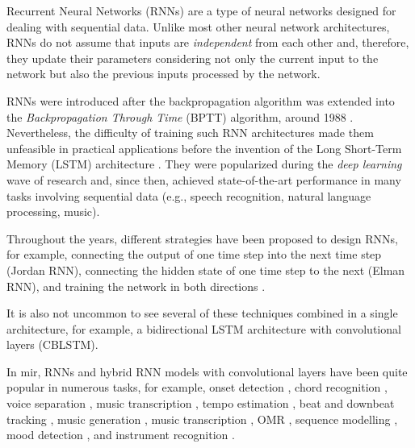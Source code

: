

Recurrent Neural Networks (RNNs) are a type of neural
networks designed for dealing with sequential data. Unlike
most other neural network architectures, RNNs do not assume
that inputs are \emph{independent} from each other and,
therefore, they update their parameters considering not only
the current input to the network but also the previous
inputs processed by the network.

RNNs were introduced after the backpropagation algorithm
\parencite{rumelhart1988learning} was extended into the
\emph{Backpropagation Through Time} (BPTT) algorithm, around
1988 \parencite{werbos1988generalization,
werbos1990backpropagation}. Nevertheless, the difficulty of
training such RNN architectures made them unfeasible in
practical applications before the invention of the Long
Short-Term Memory (LSTM) architecture
\parencite{hochreiter1997long}. They were popularized during
the \emph{deep learning} wave of research and, since then,
achieved state-of-the-art performance in many tasks
involving sequential data (e.g., speech recognition, natural
language processing, music).

Throughout the years, different strategies have been
proposed to design RNNs, for example, connecting the output
of one time step into the next time step (Jordan RNN),
connecting the hidden state of one time step to the next
(Elman RNN), and training the network in both directions
\parencite{schuster1997bidirectional}.

It is also not uncommon to see several of these techniques
combined in a single architecture, for example, a
bidirectional LSTM architecture with convolutional layers
(CBLSTM).

In \gls{mir}, RNNs and hybrid RNN models with convolutional layers
have been quite popular in numerous tasks, for example,
onset detection \parencite{eyben2010universal}, chord
recognition \parencite{boulangerlewandowski2013audio,
sigtia2016endend, sears2018evaluating}, voice separation
\parencite{huang2014singingvoice}, music transcription
\parencite{sigtia2014rnnbased}, tempo estimation
\parencite{bock2015accurate}, beat and downbeat tracking
\parencite{bock2016joint, krebs2016downbeat}, music
generation \parencite{liu2016predicting, liang2017automatic,
lim2017chord}, music transcription
\parencite{rigaud2016singing, sigtia2016endend,
southall2016automatic, vogl2016recurrent,
southall2017automatic, vogl2017drum, basaran2018main}, OMR
\parencite{calvozaragoza2017onestep, wel2017optical,
calvozaragoza2018cameraprimus}, sequence modelling
\parencite{ycart2017study}, mood detection
\parencite{delbouys2018music}, and instrument recognition
\parencite{gururani2018instrument}.



